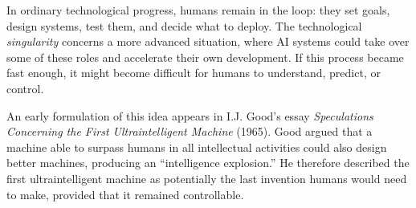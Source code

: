 \documentclass[11pt,openany,oneside]{book}
\begin{document}
  
   In ordinary technological progress, humans remain in the loop: they set goals, design systems, test them, and decide what to deploy. The technological \emph{singularity}
  concerns a more advanced situation, where AI systems could take over some of these roles and accelerate their own development. If this process became fast enough, it
  might become difficult for humans to understand, predict, or control.
  

An early formulation of this idea appears in I.J. Good's essay
\emph{Speculations Concerning the First Ultraintelligent Machine} (1965). Good
argued that a machine able to surpass humans in all intellectual activities
could also design better machines, producing an ``intelligence explosion.'' He
therefore described the first ultraintelligent machine as potentially the last
invention humans would need to make, provided that it remained controllable.


\end{document}
